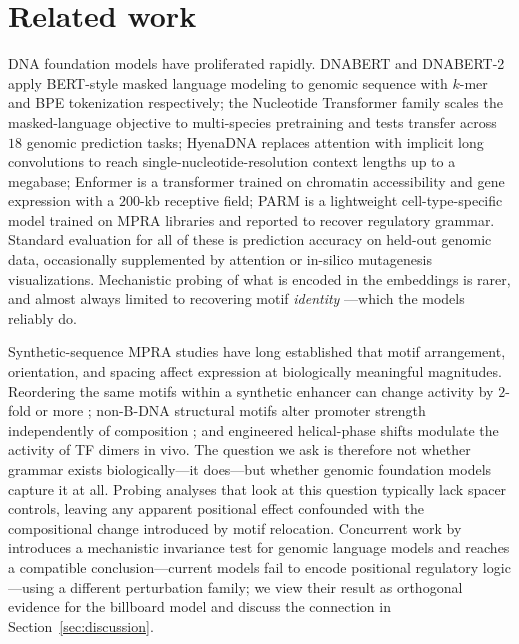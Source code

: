\documentclass{article}
\begin{document}
\section{Related work}
\label{sec:related}

DNA foundation models have proliferated rapidly. DNABERT \citep{ji2021dnabert} and DNABERT-2 \citep{zhou2023dnabert2} apply BERT-style masked language modeling to genomic sequence with $k$-mer and BPE tokenization respectively; the Nucleotide Transformer family \citep{dalla2025nt} scales the masked-language objective to multi-species pretraining and tests transfer across $18$ genomic prediction tasks; HyenaDNA \citep{nguyen2023hyenadna} replaces attention with implicit long convolutions to reach single-nucleotide-resolution context lengths up to a megabase; Enformer \citep{avsec2021enformer} is a transformer trained on chromatin accessibility and gene expression with a $200$-kb receptive field; PARM \citep{aerts2024parm} is a lightweight cell-type-specific model trained on MPRA libraries and reported to recover regulatory grammar. Standard evaluation for all of these is prediction accuracy on held-out genomic data, occasionally supplemented by attention or in-silico mutagenesis visualizations. Mechanistic probing of what is encoded in the embeddings is rarer, and almost always limited to recovering motif \emph{identity} \citep{ji2021dnabert,zhou2023dnabert2}---which the models reliably do.

Synthetic-sequence MPRA studies have long established that motif arrangement, orientation, and spacing affect expression at biologically meaningful magnitudes. Reordering the same motifs within a synthetic enhancer can change activity by $2$-fold or more \citep{smith2013syntax,king2020synthetic}; non-B-DNA structural motifs alter promoter strength independently of composition \citep{georgakopoulos2023}; and engineered helical-phase shifts modulate the activity of TF dimers in vivo. The question we ask is therefore not whether grammar exists biologically---it does---but whether genomic foundation models capture it at all. Probing analyses that look at this question typically lack spacer controls, leaving any apparent positional effect confounded with the compositional change introduced by motif relocation. Concurrent work by \citet{cheng2026mit} introduces a mechanistic invariance test for genomic language models and reaches a compatible conclusion---current models fail to encode positional regulatory logic---using a different perturbation family; we view their result as orthogonal evidence for the billboard model and discuss the connection in Section~\ref{sec:discussion}.
\end{document}
